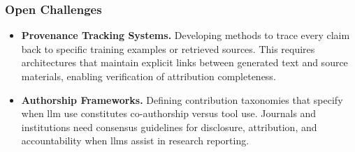 \subsubsection{Open Challenges}
\begin{itemize}
    \item \textbf{Provenance Tracking Systems.} Developing methods to trace every claim back to specific training examples or retrieved sources. This requires architectures that maintain explicit links between generated text and source materials, enabling verification of attribution completeness.
    
    \item \textbf{Authorship Frameworks.} Defining contribution taxonomies that specify when \gls{llm} use constitutes co-authorship versus tool use. Journals and institutions need consensus guidelines for disclosure, attribution, and accountability when \glspl{llm} assist in research reporting.
\end{itemize}